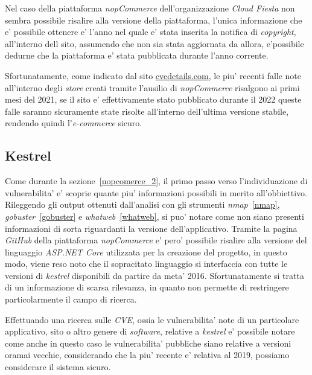 \documentclass[a4paper]{report}
\begin{document}
				Nel caso della piattaforma \emph{nopCommerce} dell'organizzazione \emph{Cloud Fiesta} non sembra
				possibile risalire alla versione della piattaforma, l'unica informazione che e' possibile ottenere e'
				l'anno nel quale e' stata inserita la notifica di \emph{copyright}, all'interno dell sito,
				assumendo che non sia stata aggiornata da allora, e'possibile dedurne che la piattaforma e' stata
				pubblicata durante l'anno corrente.

				Sfortunatamente, come indicato dal sito
				\href{https://www.cvedetails.com/vulnerability-list.php?vendor_id=19803&product_id=0&version_id=0&page=1&hasexp=0&opdos=0&opec=0&opov=0&opcsrf=0&opgpriv=0&opsqli=0&opxss=0&opdirt=0&opmemc=0&ophttprs=0&opbyp=0&opfileinc=0&opginf=0&cvssscoremin=0&cvssscoremax=0&year=0&cweid=0&order=1&trc=7&sha=e467697bc2d0e9c2996500ae46cf86049a8683c2}{cvedetails.com},
				le piu' recenti falle note all'interno degli \emph{store} creati tramite l'ausilio di \emph{nopCommerce}
				risalgono ai primi mesi del 2021, se il sito e' effettivamente stato pubblicato durante il 2022 queste
				falle saranno sicuramente state risolte all'interno dell'ultima versione stabile, rendendo quindi
				l'\emph{e-commerce} sicuro.
			\subsection{Kestrel}\label{kestrel}
				Come durante la sezione~\ref{nopcomerce_2}, il primo passo verso l'individuazione di vulnerabilita' e'
				scoprie quante piu' informazioni possibili in merito all'obbiettivo. Rileggendo gli output ottenuti
				dall'analisi con gli strumenti \emph{nmap}~\ref{nmap}, \emph{gobuster}~\ref{gobuster} e
				\emph{whatweb}~\ref{whatweb}, si puo' notare come non siano presenti informazioni di sorta riguardanti
				la versione dell'applicativo. Tramite la pagina \emph{GitHub} della piattaforma \emph{nopCommerce} e'
				pero' possibile risalire alla versione del linguaggio \emph{ASP.NET Core} utilizzata per la creazione
				del progetto, in questo modo, viene reso noto che il sopracitato linguaggio si interfaccia con tutte le
				versioni di \emph{kestrel} disponibili da partire da meta' 2016. Sfortunatamente si tratta di un
				informazione di scarsa rilevanza, in quanto non permette di restringere particolarmente il campo di
				ricerca.

				Effettuando una ricerca sulle \emph{CVE}, ossia le vulnerabilita' note di un particolare applicativo,
				sito o altro genere di \emph{software}, relative a \emph{kestrel} e' possibile notare come anche in
				questo caso le vulnerabilita' pubbliche siano relative a versioni oramai vecchie, considerando che la
				piu' recente e' relativa al 2019, possiamo considerare il sistema sicuro.
\end{document}
